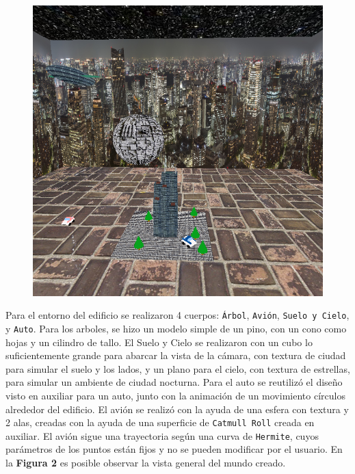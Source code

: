 \documentclass[letterpaper,11pt]{article}
\begin{document}
\begin{figure}
  \centering
  \includegraphics[scale=0.45]{images/tarea2/ciudad_entera.png}
  \label{fig: vista_inicial}
\end{figure}

Para el entorno del edificio se realizaron 4 cuerpos: \texttt{Árbol}, \texttt{Avión}, \texttt{Suelo y Cielo}, y \texttt{Auto}. Para los arboles, se hizo un modelo simple de un pino, con un cono como hojas y un cilindro de tallo. El Suelo y Cielo se realizaron con un cubo lo suficientemente grande para abarcar la vista de la cámara, con textura de ciudad para simular el suelo y los lados, y un plano para el cielo, con textura de estrellas, para simular un ambiente de ciudad nocturna. Para el auto se reutilizó el diseño visto en auxiliar para un auto, junto con la animación de un movimiento círculos alrededor del edificio. El avión se realizó con la ayuda de una esfera con textura y 2 alas, creadas con la ayuda de una superficie de \texttt{Catmull Roll} creada en auxiliar. El avión sigue una trayectoria según una curva de \texttt{Hermite}, cuyos parámetros de los puntos están fijos y no se pueden modificar por el usuario. En la \textbf{Figura 2} es posible observar la vista general del mundo creado.
\end{document}
